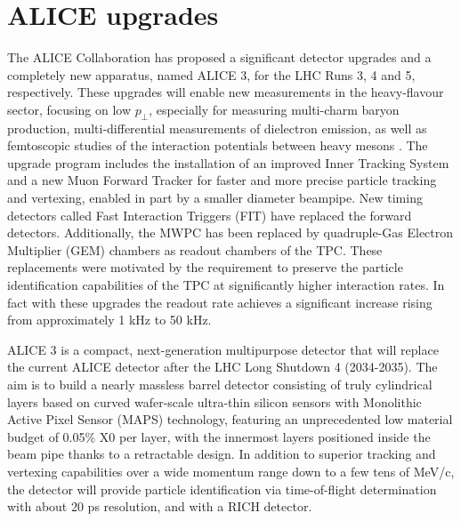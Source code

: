 \documentclass[12pt,a4paper]{book}
\begin{document}
	\section{ALICE upgrades}
	 The ALICE Collaboration has proposed a significant detector upgrades and a completely new apparatus, named ALICE 3, for the LHC Runs 3, 4 and 5, respectively. These upgrades will enable new measurements in the heavy-flavour sector, focusing on low $p_\perp$, especially for measuring multi-charm baryon production, multi-differential measurements of dielectron emission, as well as femtoscopic studies of the interaction potentials between heavy mesons \cite{Cheng:2908766}. The upgrade program includes the installation of an improved Inner Tracking System and a new Muon Forward Tracker for faster and more precise particle tracking and vertexing, enabled in part by a smaller diameter beampipe. New timing detectors called Fast Interaction Triggers (FIT) have replaced the forward detectors. Additionally, the MWPC has been replaced by quadruple-Gas Electron Multiplier (GEM) chambers as readout chambers of the TPC. These replacements were motivated by the requirement to preserve the particle identification capabilities of the TPC at significantly higher interaction rates. In fact with these upgrades the readout rate achieves a significant increase rising from approximately 1 kHz to 50 kHz. 
	
	ALICE 3 is a compact, next-generation multipurpose detector that will replace the current ALICE detector after the LHC Long Shutdown 4 (2034-2035). The aim is to build a nearly massless barrel detector consisting of truly cylindrical layers based on curved wafer-scale ultra-thin silicon sensors with Monolithic Active Pixel Sensor (MAPS) technology, featuring an unprecedented low material budget of 0.05\% X0 per layer, with the innermost layers positioned inside the beam pipe thanks to a retractable design. In addition to superior tracking and vertexing capabilities over a wide momentum range down to a few tens of MeV/c, the detector will provide particle identification via time-of-flight determination with about 20 ps resolution, and with a RICH detector.
	
\end{document}
